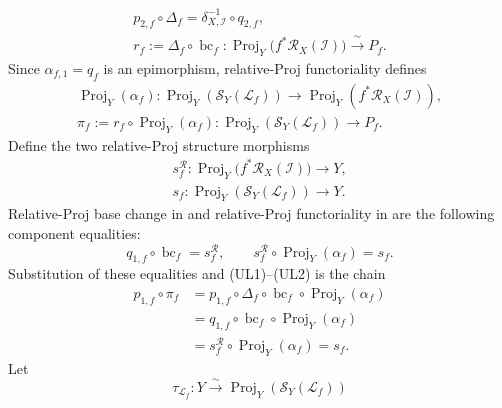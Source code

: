 \begin{definition}
\[\begin{gathered}
    p_{2,f}\circ\Delta_f=
      \delta_{X,\mathcal I}^{-1}\circ q_{2,f},\\
    r_f:=\Delta_f\circ\operatorname{bc}_f\colon
      \operatorname{Proj}_Y\!\bigl(f^*\mathcal R_X(\mathcal I)\bigr)
      \xrightarrow{\ \sim\ }P_f.
  \end{gathered}                                               \tag{UL1}
  \]
  Since $\alpha_{f,1}=q_f$ is an epimorphism, relative-Proj functoriality
  \cite[\href{https://stacks.math.columbia.edu/tag/01O4}{Tag 01O4}]
  {stacks-project} defines
  \[
  \begin{gathered}
    \operatorname{Proj}_Y(\alpha_f)\colon
      \operatorname{Proj}_Y(\mathcal S_Y(\mathcal L_f))
      \longrightarrow
      \operatorname{Proj}_Y(f^*\mathcal R_X(\mathcal I)),\\
    \pi_f:=r_f\circ\operatorname{Proj}_Y(\alpha_f)\colon
      \operatorname{Proj}_Y(\mathcal S_Y(\mathcal L_f))
      \longrightarrow P_f.
  \end{gathered}
  \tag{UL2}
  \]
  Define the two relative-Proj structure morphisms
  \[
  \begin{gathered}
    s_f^{\mathcal R}\colon
      \operatorname{Proj}_Y\!\bigl(f^*\mathcal R_X(\mathcal I)\bigr)
        \longrightarrow Y,\\
    s_f\colon\operatorname{Proj}_Y(\mathcal S_Y(\mathcal L_f))
      \longrightarrow Y.
  \end{gathered}
  \]
  Relative-Proj base change in
  \cite[\href{https://stacks.math.columbia.edu/tag/01O3}{Tag 01O3}]
  {stacks-project} and relative-Proj functoriality in
  \cite[\href{https://stacks.math.columbia.edu/tag/01O4}{Tag 01O4}]
  {stacks-project} are the following component equalities:
  \[
    q_{1,f}\circ\operatorname{bc}_f=s_f^{\mathcal R},
    \qquad
    s_f^{\mathcal R}\circ\operatorname{Proj}_Y(\alpha_f)=s_f.
  \]
  Substitution of these equalities and (UL1)--(UL2) is the chain
  \[
  \begin{aligned}
    p_{1,f}\circ\pi_f
      &=p_{1,f}\circ\Delta_f\circ\operatorname{bc}_f
          \circ\operatorname{Proj}_Y(\alpha_f)\\
      &=q_{1,f}\circ\operatorname{bc}_f
          \circ\operatorname{Proj}_Y(\alpha_f)\\
      &=s_f^{\mathcal R}\circ\operatorname{Proj}_Y(\alpha_f)
       =s_f.
  \end{aligned}                                                  \tag{UL3}
  \]
  Let
  \[
    \tau_{\mathcal L_f}\colon
      Y\xrightarrow{\sim}
      \operatorname{Proj}_Y(\mathcal S_Y(\mathcal L_f))
\]
\end{definition}
